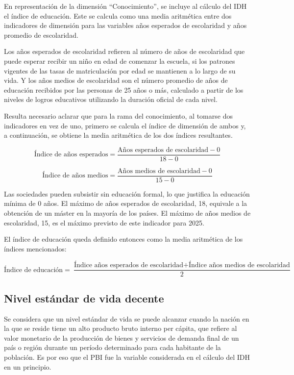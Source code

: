 \documentclass[
  10pt,
]{article}
\begin{document}
En representación de la dimensión ``Conocimiento'', se incluye al
cálculo del IDH el índice de educación. Este se calcula como una media
aritmética entre dos indicadores de dimensión para las variables años
esperados de escolaridad y años promedio de escolaridad.

Los años esperados de escolaridad refieren al número de años de
escolaridad que puede esperar recibir un niño en edad de comenzar la
escuela, si los patrones vigentes de las tasas de matriculación por edad
se mantienen a lo largo de su vida. Y los años medios de escolaridad son
el número promedio de años de educación recibidos por las personas de 25
años o más, calculado a partir de los niveles de logros educativos
utilizando la duración oficial de cada nivel.

Resulta necesario aclarar que para la rama del conocimiento, al tomarse
dos indicadores en vez de uno, primero se calcula el índice de dimensión
de ambos y, a continuación, se obtiene la media aritmética de los dos
índices resultantes.

\[\text{Índice de años esperados} = \frac{\text{Años esperados de escolaridad}-0}{18-0}\]

\[\text{Índice de años medios} = \frac{\text{Años medios de escolaridad}-0}{15-0}\]

Las sociedades pueden subsistir sin educación formal, lo que justifica
la educación mínima de 0 años. El máximo de años esperados de
escolaridad, 18, equivale a la obtención de un máster en la mayoría de
los países. El máximo de años medios de escolaridad, 15, es el máximo
previsto de este indicador para 2025.

El índice de educación queda definido entonces como la media aritmética
de los índices mencionados:

\[\text{Índice de educación} = \frac{\text{Índice años esperados de escolaridad}+\text{Índice años medios de escolaridad}}{2}\]

\hypertarget{nivel-estuxe1ndar-de-vida-decente}{%
\subsection{Nivel estándar de vida
decente}\label{nivel-estuxe1ndar-de-vida-decente}}

Se considera que un nivel estándar de vida se puede alcanzar cuando la
nación en la que se reside tiene un alto producto bruto interno per
cápita, que refiere al valor monetario de la producción de bienes y
servicios de demanda final de un país o región durante un período
determinado para cada habitante de la población. Es por eso que el PBI
fue la variable considerada en el cálculo del IDH en un principio.
\end{document}
